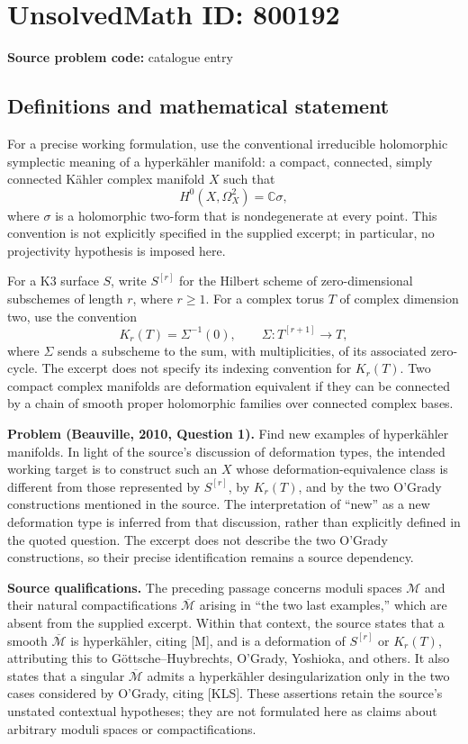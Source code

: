 \documentclass[11pt]{article}
\newcommand{\C}{\mathbb{C}}
\begin{document}
\section*{UnsolvedMath ID: 800192}
\textbf{Source problem code:} catalogue entry
\subsection{Definitions and mathematical statement}
For a precise working formulation, use the conventional irreducible holomorphic symplectic meaning of a hyperk\"ahler manifold: a compact, connected, simply connected K\"ahler complex manifold \(X\) such that
\[
H^0(X,\Omega_X^2)=\C\sigma,
\]
where \(\sigma\) is a holomorphic two-form that is nondegenerate at every point. This convention is not explicitly specified in the supplied excerpt; in particular, no projectivity hypothesis is imposed here.

For a K3 surface \(S\), write \(S^{[r]}\) for the Hilbert scheme of zero-dimensional subschemes of length \(r\), where \(r\geq 1\). For a complex torus \(T\) of complex dimension two, use the convention
\[
K_r(T)=\Sigma^{-1}(0),\qquad
\Sigma:T^{[r+1]}\longrightarrow T,
\]
where \(\Sigma\) sends a subscheme to the sum, with multiplicities, of its associated zero-cycle. The excerpt does not specify its indexing convention for \(K_r(T)\). Two compact complex manifolds are deformation equivalent if they can be connected by a chain of smooth proper holomorphic families over connected complex bases.

\textbf{Problem (Beauville, 2010, Question 1).} Find new examples of hyperk\"ahler manifolds. In light of the source's discussion of deformation types, the intended working target is to construct such an \(X\) whose deformation-equivalence class is different from those represented by \(S^{[r]}\), by \(K_r(T)\), and by the two O'Grady constructions mentioned in the source. The interpretation of ``new'' as a new deformation type is inferred from that discussion, rather than explicitly defined in the quoted question. The excerpt does not describe the two O'Grady constructions, so their precise identification remains a source dependency.

\textbf{Source qualifications.} The preceding passage concerns moduli spaces \(\mathcal M\) and their natural compactifications \(\overline{\mathcal M}\) arising in ``the two last examples,'' which are absent from the supplied excerpt. Within that context, the source states that a smooth \(\overline{\mathcal M}\) is hyperk\"ahler, citing [M], and is a deformation of \(S^{[r]}\) or \(K_r(T)\), attributing this to G\"ottsche--Huybrechts, O'Grady, Yoshioka, and others. It also states that a singular \(\overline{\mathcal M}\) admits a hyperk\"ahler desingularization only in the two cases considered by O'Grady, citing [KLS]. These assertions retain the source's unstated contextual hypotheses; they are not formulated here as claims about arbitrary moduli spaces or compactifications.
\end{document}
